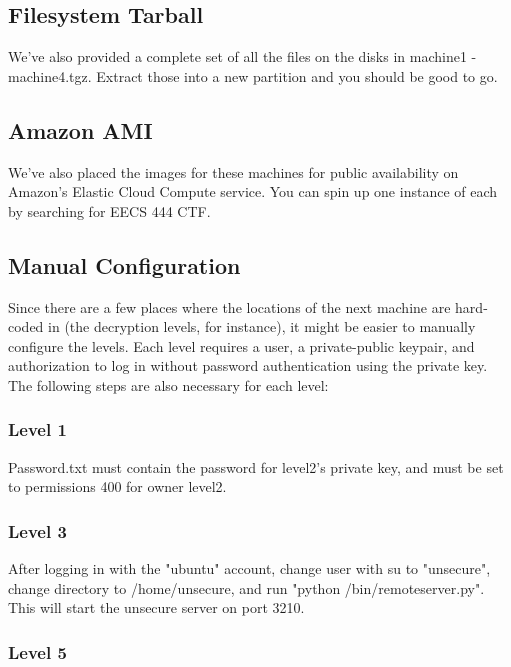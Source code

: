 \documentclass[12pt]{article}
\begin{document}
\subsection{Filesystem Tarball}
We've also provided a complete set of all the files on the disks in machine1 - machine4.tgz.  Extract those into a new partition and you should be good to go.
\subsection{Amazon AMI}
We've also placed the images for these machines for public availability on Amazon's Elastic Cloud Compute service.  You can spin up one instance of each by searching for EECS 444 CTF.
\subsection{Manual Configuration}
Since there are a few places where the locations of the next machine are hard-coded in (the decryption levels, for instance), it might be easier to manually configure the levels.  Each level requires a user, a private-public keypair, and authorization to log in without password authentication using the private key.  The following steps are also necessary for each level:
\subsubsection{Level 1}
Password.txt must contain the password for level2's private key, and must be set to permissions 400 for owner level2.
\subsubsection{Level 3}
After logging in with the "ubuntu" account, change user with su to "unsecure", change directory to /home/unsecure, and run "python /bin/remoteserver.py". This will start the unsecure server on port 3210.

\subsubsection{Level 5}
\end{document}
